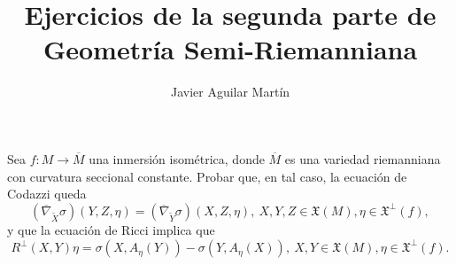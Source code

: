 \documentclass[twoside]{article}
\begin{document}
\title{Ejercicios de la segunda parte de Geometría Semi-Riemanniana}
\author{Javier Aguilar Martín}
\maketitle


\begin{ejercicio}{1}
 Sea $f : M → \overline{M}$ una inmersión isométrica, donde $\overline{M}$ es una variedad riemanniana
con curvatura seccional constante.
Probar que, en tal caso, la ecuación de Codazzi queda
\[
(\overline{∇}_{\widetilde{X}} σ)(Y, Z, η) = (\overline{∇}_{\widetilde{Y}} σ)(X, Z, η),\ X, Y, Z ∈ \mathfrak{X}(M), η ∈ \mathfrak{X}^⊥(f),
\]
y que la ecuación de Ricci implica que
\[
R^⊥(X, Y )η = σ(X, A_η(Y )) − σ(Y, A_η(X)),\ X, Y ∈ \mathfrak{X}(M), η ∈ \mathfrak{X}^⊥(f).
\]
\end{ejercicio}
\end{document}
